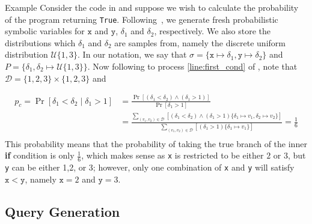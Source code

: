 \documentclass[acmsmall,review,anonymous]{acmart}\settopmatter{printfolios=true,printccs=false,printacmref=false}
\begin{document}
\begin{paragraph}{Example}
	Consider the code in  and suppose we wish to calculate the probability of the program returning \texttt{True}.
	Following~, we generate fresh probabilistic symbolic variables for $\mathtt{x}$ and $\mathtt{y}$, $\delta_1$ and $\delta_2$, respectively.
	We also store the distributions which $\delta_1$ and $\delta_2$ are samples from, namely the discrete uniform distribution $\mathcal{U}\{1,3\}$.
	In our notation, we say that $\sigma = \{ \mathtt{x} \mapsto \delta_1, \mathtt{y} \mapsto \delta_2 \}$ and $P = \{ \delta_1,\delta_2 \mapsto \mathcal{U}\{1,3\} \}$.
	Now following  to process \cref{line:first_cond} of , note that $\mathcal{D} = \{1,2,3\} \times \{1,2,3\}$ and 
	
	\begin{align*}
		p_c = \Pr[\delta_1 < \delta_2 \mid \delta_1 > 1] &= \frac{\Pr[(\delta_1 < \delta_2) \wedge (\delta_1 > 1)]}{\Pr[\delta_1 > 1]}\\
                                   &= \frac{\displaystyle\sum_{(v_1,v_2) \in \mathcal{D}} [(\delta_1 < \delta_2) \wedge (\delta_1 > 1)\{\delta_1 \mapsto v_1, \delta_2 \mapsto v_2\}]}{\displaystyle\sum_{(v_1,v_2) \in \mathcal{D}} [(\delta_1 > 1)\{\delta_1 \mapsto v_1\}]} = \frac{1}{6}\\
	\end{align*}
  This probability means that the probability of taking the true branch of the inner \textbf{if} condition is only $\frac{1}{6}$, which makes sense as \texttt{x} is restricted to be either $2$ or $3$, but \texttt{y} can be either 1,2, or 3; however, only one combination of \texttt{x} and \texttt{y} will satisfy $\mathtt{x} < \mathtt{y}$, namely $\mathtt{x} = 2$ and $\mathtt{y} = 3$.
\end{paragraph}


\subsection{Query Generation}
\label{sec:query_gen}
\end{document}
